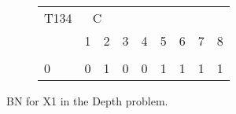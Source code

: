 \documentclass[10pt,]{scrartcl}
\begin{document}
\begin{figure}
{\begin{subfigure}[!ht]{0.3\textwidth}
\begin{table}[H]
\centering
\begin{tabular}{lrrrrrrrr}
\toprule
\multicolumn{1}{c}{T134} & \multicolumn{2}{c}{C} \\
  & 1 & 2 & 3 & 4 & 5 & 6 & 7 & 8\\
\midrule
\cellcolor{gray!6}{1} & \cellcolor{gray!6}{1} & \cellcolor{gray!6}{0} & \cellcolor{gray!6}{1} & \cellcolor{gray!6}{1} & \cellcolor{gray!6}{0} & \cellcolor{gray!6}{0} & \cellcolor{gray!6}{0} & \cellcolor{gray!6}{0}\\
0 & 0 & 1 & 0 & 0 & 1 & 1 & 1 & 1\\
\bottomrule
\end{tabular}
\end{table}
\end{subfigure}}
\caption{BN for \textsf{X1} in the \textsf{Depth} problem.}
\label{fig:dod1}
\end{figure}
\end{document}
